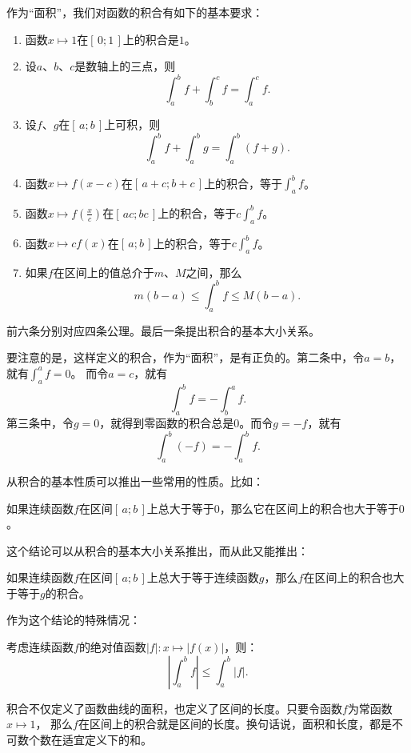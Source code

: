 \documentclass[12pt,UTF8]{ctexbook}
\begin{document}
作为“面积”，我们对函数的积合有如下的基本要求：

\begin{enumerate}
    \item 函数$x\mapsto 1$在$[\,0;1\,]$上的积合是$1$。
    \item 设$a$、$b$、$c$是数轴上的三点，则
        $$\int_a^b f + \int_b^c f = \int_a^c f.$$
    \item 设$f$、$g$在$[\,a; b\,]$上可积，则
        $$ \int_a^b f + \int_a^b g = \int_a^b (f + g). $$
    \item 函数$x\mapsto f(x-c)$在$[\,a+c;b+c\,]$上的积合，等于$\int_a^b f$。
    \item 函数$x\mapsto f\left(\frac{x}{c}\right)$在$[\,ac; bc\,]$上的积合，等于$c\int_a^b f$。
    \item 函数$x\mapsto cf(x)$在$[\,a; b\,]$上的积合，等于$c\int_a^b f$。
    \item 如果$f$在区间上的值总介于$m$、$M$之间，那么
        $$m(b - a) \leqslant \int_a^b f \leqslant M(b - a).$$
\end{enumerate}
前六条分别对应四条公理。最后一条提出积合的基本大小关系。

要注意的是，这样定义的积合，作为“面积”，是有正负的。第二条中，令$a=b$，就有$\int_a^a f = 0$。
而令$a = c$，就有
$$\int_a^b f = - \int_b^a f.$$
第三条中，令$g=0$，就得到零函数的积合总是$0$。而令$g = -f$，就有
$$\int_a^b (-f) = -\int_a^b f. $$

从积合的基本性质可以推出一些常用的性质。比如：

\begin{tm}
    如果连续函数$f$在区间$[\,a; b\,]$上总大于等于$0$，那么它在区间上的积合也大于等于$0$。
\end{tm}

这个结论可以从积合的基本大小关系推出，而从此又能推出：

\begin{tm}
    如果连续函数$f$在区间$[\,a; b\,]$上总大于等于连续函数$g$，那么$f$在区间上的积合也大于等于$g$的积合。
\end{tm}

作为这个结论的特殊情况：

\begin{tm}
    考虑连续函数$f$的绝对值函数$|f|: x\mapsto |f(x)|$，则：
    $$ \left| \int_a^b f \right| \leqslant \int_a^b |f|. $$

\end{tm}

积合不仅定义了函数曲线的面积，也定义了区间的长度。只要令函数$f$为常函数$x\mapsto 1$，
那么$f$在区间上的积合就是区间的长度。换句话说，面积和长度，都是不可数个数在适宜定义下的和。
\end{document}
